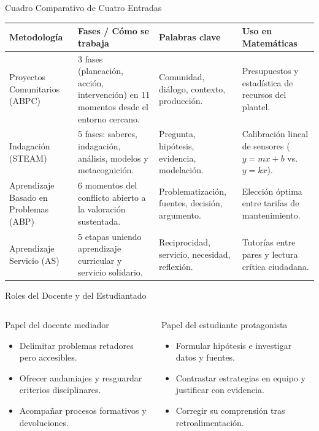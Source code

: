 \documentclass[aspectratio=169,spanish,xcolor=table]{beamer}
\begin{document}
\begin{frame}{Cuadro Comparativo de Cuatro Entradas}
  \renewcommand{\arraystretch}{1.24}
  \scriptsize
  \begin{tabular}{p{2.5cm}p{4.3cm}p{3.0cm}p{3.8cm}}
    \toprule
    \textbf{Metodología} & \textbf{Fases / Cómo se trabaja} & \textbf{Palabras clave} & \textbf{Uso en Matemáticas} \\
    \midrule
    Proyectos Comunitarios (ABPC) & 3 fases (planeación, acción, intervención) en 11 momentos desde el entorno cercano. & Comunidad, diálogo, contexto, producción. & Presupuestos y estadística de recursos del plantel. \\
    Indagación (STEAM) & 5 fases: saberes, indagación, análisis, modelos y metacognición. & Pregunta, hipótesis, evidencia, modelación. & Calibración lineal de sensores ($y=mx+b$ vs. $y=kx$). \\
    Aprendizaje Basado en Problemas (ABP) & 6 momentos del conflicto abierto a la valoración sustentada. & Problematización, fuentes, decisión, argumento. & Elección óptima entre tarifas de mantenimiento. \\
    Aprendizaje Servicio (AS) & 5 etapas uniendo aprendizaje curricular y servicio solidario. & Reciprocidad, servicio, necesidad, reflexión. & Tutorías entre pares y lectura crítica ciudadana. \\
    \bottomrule
  \end{tabular}
\end{frame}

\begin{frame}{Roles del Docente y del Estudiantado}
  \begin{columns}[T]
      \begin{block}{Papel del docente mediador}
        \begin{itemize}\scriptsize
          \item Delimitar problemas retadores pero accesibles.
          \item Ofrecer andamiajes y resguardar criterios disciplinares.
          \item Acompañar procesos formativos y devoluciones.
        \end{itemize}
      \end{block}
      \begin{block}{Papel del estudiante protagonista}
        \begin{itemize}\scriptsize
          \item Formular hipótesis e investigar datos y fuentes.
          \item Contrastar estrategias en equipo y justificar con evidencia.
          \item Corregir su comprensión tras retroalimentación.
        \end{itemize}
      \end{block}
  \end{columns}
\end{frame}
\end{document}
